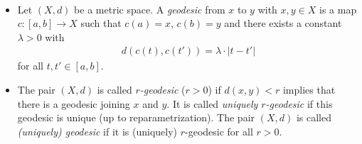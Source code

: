 \begin{defin}[Geodesics]~
  \begin{itemize}
  \item Let \((X, d)\) be a metric space. A \emph{geodesic} from \(x\) to \(y\) with \(x,y \in X\) is a map \(c\colon [a,b] \to X\) such that \(c(a) = x\), \(c(b) = y\) and there exists a constant \(\lambda > 0\) with
    \begin{align*}
      d(c(t), c(t')) = \lambda \cdot |t - t'| 
    \end{align*}
    for all \(t,t' \in [a,b]\).
  \item The pair \((X,d)\) is called \emph{\(r\)-geodesic} (\(r > 0\)) if \(d(x,y) < r\) implies that there is a geodesic joining \(x\) and \(y\). It is called \emph{uniquely \(r\)-geodesic} if this geodesic is unique (up to reparametrization). The pair \((X,d)\) is called \emph{(uniquely) geodesic} if it is (uniquely) \(r\)-geodesic for all \(r > 0\).
  \end{itemize}
\end{defin}

